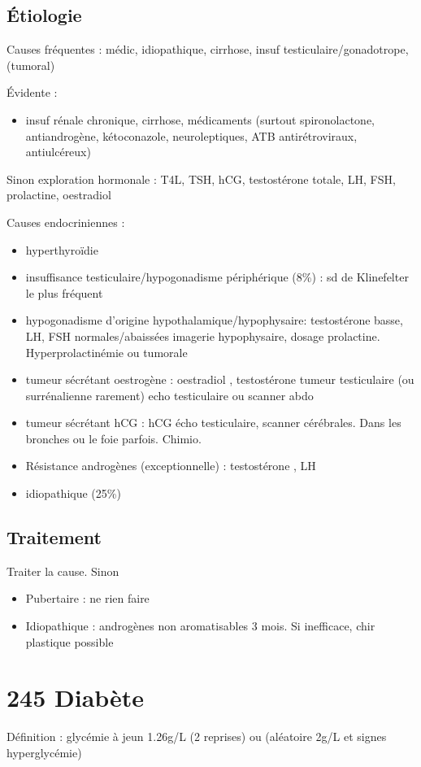 \documentclass{book}
\begin{document}
\subsection{Étiologie}
\label{sec:org50e8a51}
\begin{tcolorbox}
Causes fréquentes : médic, idiopathique, cirrhose, insuf testiculaire/gonadotrope, (tumoral)
\end{tcolorbox}
Évidente :
\begin{itemize}
\item insuf rénale chronique, cirrhose, médicaments (surtout spironolactone,
antiandrogène, kétoconazole, neuroleptiques, ATB antirétroviraux, antiulcéreux)
\end{itemize}
Sinon exploration hormonale : T4L, TSH, hCG, testostérone totale, LH, FSH,
prolactine, oestradiol

Causes endocriniennes :
\begin{itemize}
\item hyperthyroïdie
\item insuffisance testiculaire/hypogonadisme périphérique (8\%) : sd de Klinefelter
le plus fréquent
\item hypogonadisme d'origine hypothalamique/hypophysaire: testostérone basse, LH,
FSH normales/abaissées \thus imagerie hypophysaire, dosage
prolactine. Hyperprolactinémie ou tumorale
\item tumeur sécrétant oestrogène : oestradiol \inc, testostérone \dec \thus tumeur
testiculaire (ou surrénalienne rarement) \thus echo testiculaire ou scanner
abdo
\item tumeur sécrétant hCG : \inc hCG \thus écho testiculaire, scanner
cérébrales. Dans les bronches ou le foie parfois. Chimio.
\item Résistance androgènes (exceptionnelle) : testostérone \inc, LH \inc
\item idiopathique (25\%)
\end{itemize}

\subsection{Traitement}
\label{sec:org6bb8685}
Traiter la cause. Sinon
\begin{itemize}
\item Pubertaire : ne rien faire
\item Idiopathique : androgènes non aromatisables 3 mois. Si inefficace, chir
plastique possible
\end{itemize}
\section{245 Diabète}
\label{sec:org22e593b}
\begin{tcolorbox}
 Définition : glycémie à jeun \ge 1.26g/L (2 reprises) ou (aléatoire \ge 2g/L et signes hyperglycémie)\footnotemark
\end{tcolorbox}
\end{document}
